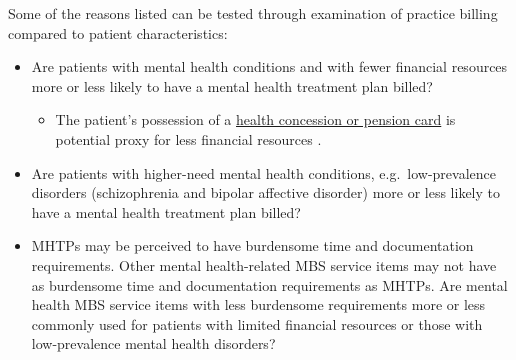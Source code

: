 \documentclass[
  letterpaper,
  DIV=11,
  numbers=noendperiod,
  oneside]{scrartcl}
\providecommand{\tightlist}{%
  \setlength{\itemsep}{0pt}\setlength{\parskip}{0pt}}\usepackage{longtable,booktabs,array}
\begin{document}
Some of the reasons listed can be tested through examination of practice
billing compared to patient characteristics:

\begin{itemize}
\tightlist
\item
  Are patients with mental health conditions and with fewer financial
  resources more or less likely to have a mental health treatment plan
  billed?

  \begin{itemize}
  \tightlist
  \item
    The patient's possession of a
    \href{https://www.servicesaustralia.gov.au/concession-and-health-care-cards?context=60091}{health
    concession or pension card} is potential proxy for less financial
    resources .
  \end{itemize}
\item
  Are patients with higher-need mental health conditions,
  e.g.~low-prevalence disorders (schizophrenia and bipolar affective
  disorder) more or less likely to have a mental health treatment plan
  billed?
\item
  MHTPs may be perceived to have burdensome time and documentation
  requirements. Other mental health-related MBS service items may not
  have as burdensome time and documentation requirements as MHTPs. Are
  mental health MBS service items with less burdensome requirements more
  or less commonly used for patients with limited financial resources or
  those with low-prevalence mental health disorders?


\end{itemize}
\end{document}
